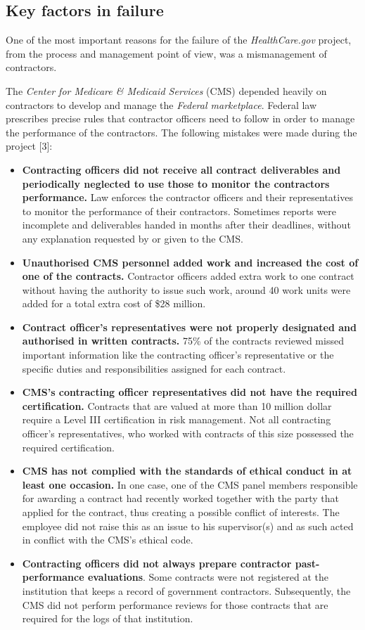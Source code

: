 \documentclass[]{article}
\begin{document}
\subsection{Key factors in failure}\label{key-factors-in-failure}

One of the most important reasons for the failure of the
\emph{HealthCare.gov} project, from the process and management point of
view, was a mismanagement of contractors.

The \emph{Center for Medicare \& Medicaid Services} (CMS) depended
heavily on contractors to develop and manage the \emph{Federal
marketplace}. Federal law prescribes precise rules that contractor
officers need to follow in order to manage the performance of the
contractors. The following mistakes were made during the project
{[}3{]}:

\begin{itemize}
\item
  \textbf{Contracting officers did not receive all contract deliverables
  and periodically neglected to use those to monitor the contractors
  performance.} Law enforces the contractor officers and their
  representatives to monitor the performance of their contractors.
  Sometimes reports were incomplete and deliverables handed in months
  after their deadlines, without any explanation requested by or given
  to the CMS.
\item
  \textbf{Unauthorised CMS personnel added work and increased the cost
  of one of the contracts.} Contractor officers added extra work to one
  contract without having the authority to issue such work, around 40
  work units were added for a total extra cost of \$28 million.
\item
  \textbf{Contract officer's representatives were not properly
  designated and authorised in written contracts.} 75\% of the contracts
  reviewed missed important information like the contracting officer's
  representative or the specific duties and responsibilities assigned
  for each contract.
\item
  \textbf{CMS's contracting officer representatives did not have the
  required certification.} Contracts that are valued at more than 10
  million dollar require a Level III certification in risk management.
  Not all contracting officer's representatives, who worked with
  contracts of this size possessed the required certification.
\item
  \textbf{CMS has not complied with the standards of ethical conduct in
  at least one occasion.} In one case, one of the CMS panel members
  responsible for awarding a contract had recently worked together with
  the party that applied for the contract, thus creating a possible
  conflict of interests. The employee did not raise this as an issue to
  his supervisor(s) and as such acted in conflict with the CMS's ethical
  code.
\item
  \textbf{Contracting officers did not always prepare contractor
  past-performance evaluations}. Some contracts were not registered at
  the institution that keeps a record of government contractors.
  Subsequently, the CMS did not perform performance reviews for those
  contracts that are required for the logs of that institution.
\end{itemize}
\end{document}
